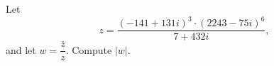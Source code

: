 Let
\[z=\dfrac{(-141+131i)^3\cdot(2243-75i)^6}{7+432i},\]
and let $w=\dfrac{\overline z}{z}$. Compute $|w|$.
